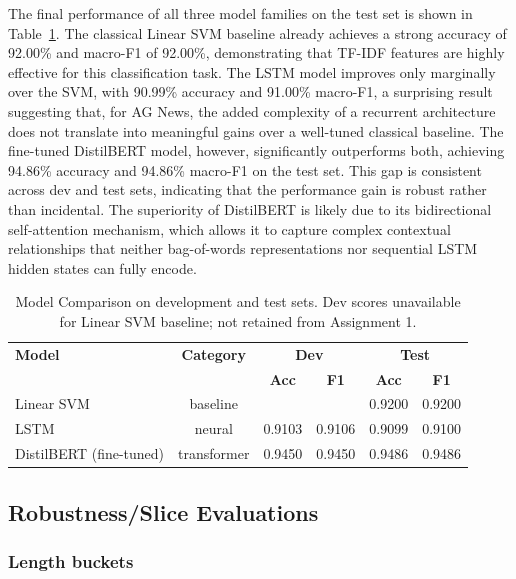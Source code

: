 The final performance of all three model families on the test set is shown in Table~\ref{tab:model_comparison}. The classical Linear SVM baseline already achieves a strong accuracy of 92.00\% and macro-F1 of 92.00\%, demonstrating that TF-IDF features are highly effective for this classification task. The LSTM model improves only marginally over the SVM, with 90.99\% accuracy and 91.00\% macro-F1, a surprising result suggesting that, for AG News, the added complexity of a recurrent architecture does not translate into meaningful gains over a well-tuned classical baseline. The fine-tuned DistilBERT model, however, significantly outperforms both, achieving 94.86\% accuracy and 94.86\% macro-F1 on the test set. This gap is consistent across dev and test sets, indicating that the performance gain is robust rather than incidental. The superiority of DistilBERT is likely due to its bidirectional self-attention mechanism, which allows it to capture complex contextual relationships that neither bag-of-words representations nor sequential LSTM hidden states can fully encode.

\begin{table}[h]
\centering
\caption{Model Comparison on development and test sets. Dev scores unavailable for Linear SVM baseline; not retained from Assignment 1.}
\label{tab:model_comparison}
\begin{tabular}{lc|cc|cc}
\textbf{Model} & \textbf{Category} & \multicolumn{2}{c|}{\textbf{Dev}} & \multicolumn{2}{c}{\textbf{Test}} \\
& & \textbf{Acc} & \textbf{F1} & \textbf{Acc} & \textbf{F1} \\
\hline
Linear SVM & baseline & ~ & ~ & 0.9200 & 0.9200 \\
LSTM & neural & 0.9103 & 0.9106 & 0.9099 & 0.9100 \\
DistilBERT (fine-tuned) & transformer & 0.9450 & 0.9450 & 0.9486 & 0.9486 \\
\end{tabular}
\end{table}

\subsection{Robustness/Slice Evaluations}

\subsubsection{Length buckets}

